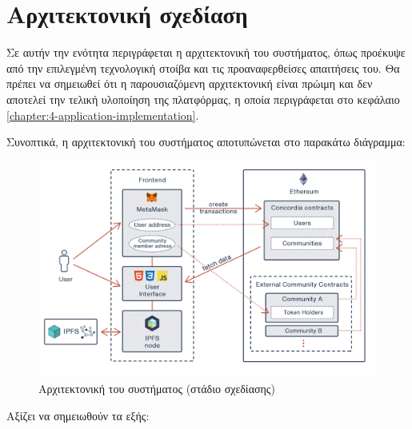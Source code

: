 \newpage
\section{Αρχιτεκτονική σχεδίαση} \label{section:3-7-architecture-design}

Σε αυτήν την ενότητα περιγράφεται η αρχιτεκτονική του συστήματος, όπως προέκυψε από την επιλεγμένη τεχνολογική στοίβα και τις προαναφερθείσες απαιτήσεις του. Θα πρέπει να σημειωθεί ότι η παρουσιαζόμενη αρχιτεκτονική είναι πρώιμη και δεν αποτελεί την τελική υλοποίηση της πλατφόρμας, η οποία περιγράφεται στο κεφάλαιο \ref{chapter:4-application-implementation}. 

Συνοπτικά, η αρχιτεκτονική του συστήματος αποτυπώνεται στο παρακάτω διάγραμμα:

\begin{figure}[H]
    \centering
    \includegraphics[width=\textwidth]{assets/figures/chapter-3/3.7.architecture-design}
    \caption{Αρχιτεκτονική του συστήματος (στάδιο σχεδίασης)}
\end{figure}

\vspace{\baselineskip}

Αξίζει να σημειωθούν τα εξής:

